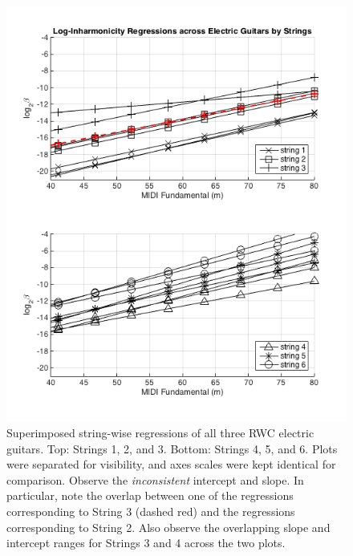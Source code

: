 \documentclass[12pt]{cmuthesis}
\begin{document}
\begin{figure}[!htbp] 
\centering
\includegraphics[scale=0.75]{traj-compare-eg}
\caption{Superimposed string-wise regressions of all three RWC electric guitars. Top: Strings 1, 2, and 3. Bottom: Strings 4, 5, and 6. Plots were separated for visibility, and axes scales were kept identical for comparison. Observe the \textit{inconsistent} intercept and slope. In particular, note the overlap between one of the regressions corresponding to String 3 (dashed red) and the regressions corresponding to String 2. Also observe the overlapping slope and intercept ranges for Strings 3 and 4 across the two plots.}
\label{fig:eg-traj-comp}
\end{figure}
\end{document}
